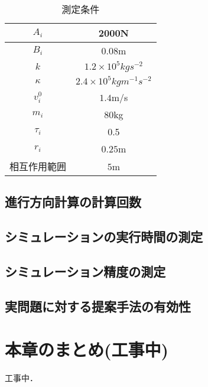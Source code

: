 \begin{table}[tb]
  \begin{center}
    \caption{測定条件}
    \label{tb:result_para}
    \begin{tabular}{c|c}
      \hline \hline
      $A_i$            & 2000N                              \\ \hline 
      $B_i$            & 0.08m                              \\ \hline 
      $k$              & $1.2 \times 10^5 kg s^{-2} $       \\ \hline 
      $\kappa$         & $2.4 \times 10^5 kg m^{-1} s^{-2}$ \\ \hline 
      $v_i^0$          & $1.4$m/s                           \\ \hline 
      $m_i$            & $80$kg                             \\ \hline 
      $\tau_i$         & 0.5                               \\ \hline 
      $r_i$            & $0.25$m                            \\ \hline 
      相互作用範囲     & $5$m                              \\ \hline 
    \end{tabular}
  \end{center}
\end{table}

\subsection{進行方向計算の計算回数}


\subsection{シミュレーションの実行時間の測定}

\subsection{シミュレーション精度の測定}

\subsection{実問題に対する提案手法の有効性}




\section{本章のまとめ(工事中)}
工事中．

